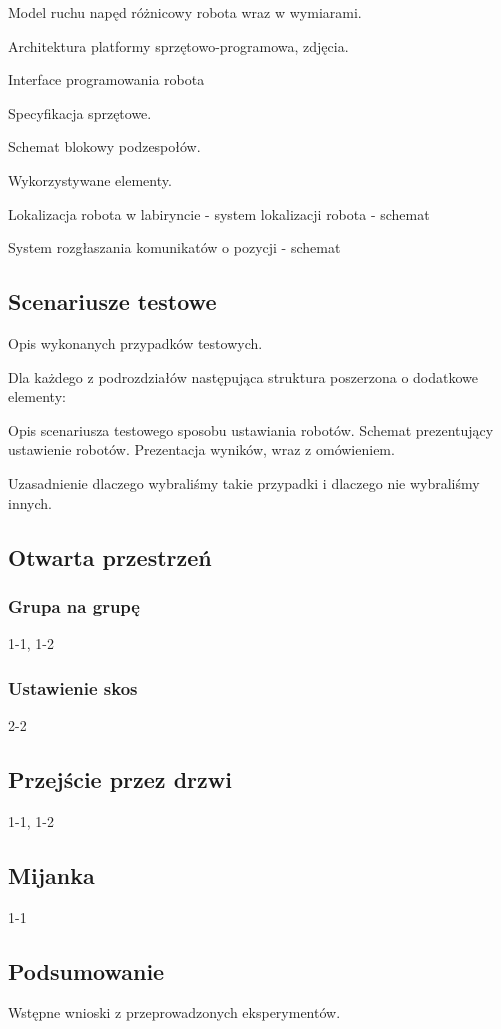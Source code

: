 Model ruchu napęd różnicowy robota wraz w wymiarami.

Architektura platformy sprzętowo-programowa, zdjęcia. 

Interface programowania robota

Specyfikacja sprzętowe.

Schemat blokowy podzespołów.

Wykorzystywane elementy.

Lokalizacja robota w labiryncie - system lokalizacji robota - schemat 

System rozgłaszania komunikatów o pozycji - schemat

\subsection{Scenariusze testowe}


Opis wykonanych przypadków testowych.

Dla każdego z podrozdziałów następująca struktura poszerzona o dodatkowe elementy:



Opis scenariusza testowego sposobu ustawiania robotów.
Schemat prezentujący ustawienie robotów.
Prezentacja wyników, wraz z omówieniem.

Uzasadnienie dlaczego wybraliśmy takie przypadki i dlaczego nie wybraliśmy innych.
 
\subsection{Otwarta przestrzeń}

\subsubsection{Grupa na grupę}

1-1, 1-2

\subsubsection{Ustawienie skos}

2-2

\subsection{Przejście przez drzwi}

1-1, 1-2

\subsection{Mijanka}

1-1

\subsection{Podsumowanie}

Wstępne wnioski z przeprowadzonych eksperymentów.
